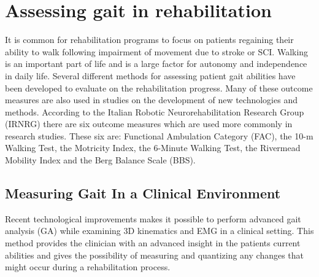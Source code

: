 \section{Assessing gait in rehabilitation}

It is common for rehabilitation programs to focus on patients regaining their ability to walk following impairment of movement due to stroke or SCI. Walking is an important part of life and is a large factor for autonomy and independence in daily life. 
Several different methods for assessing patient gait abilities have been developed to evaluate on the rehabilitation progress. Many of these outcome measures are also used in studies on the development of new technologies and methods. According to the Italian Robotic Neurorehabilitation Research Group (IRNRG) there are six outcome measures which are used more commonly in research studies. These six are: Functional Ambulation Category (FAC), the 10-m Walking Test, the Motricity Index, the 6-Minute Walking Test, the Rivermead Mobility Index and the Berg Balance Scale (BBS). \cite{Sandrini2018}

\subsection{Measuring Gait In a Clinical Environment}

Recent technological improvements makes it possible to perform advanced gait analysis (GA) while examining 3D kinematics and EMG in a clinical setting. This method provides the clinician with an advanced insight in the patients current abilities and gives the possibility of measuring and quantizing any changes that might occur during a rehabilitation process. \cite{Sandrini2018}

